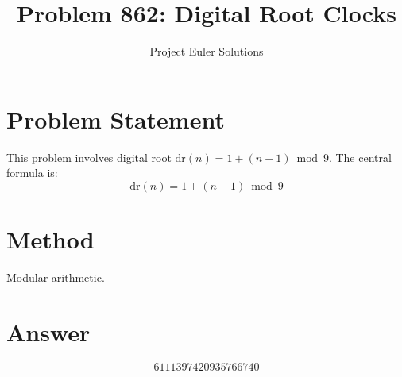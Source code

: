 \documentclass[11pt]{article}
\title{Problem 862: Digital Root Clocks}
\author{Project Euler Solutions}
\date{}
\begin{document}
\maketitle
\section{Problem Statement}
This problem involves digital root $\text{dr}(n) = 1 + (n-1) \bmod 9$. The central formula is:
\[
\text{dr}(n) = 1 + (n-1) \bmod 9
\]
\section{Method}
Modular arithmetic.
\section{Answer}

\[
\boxed{6111397420935766740}
\]
\end{document}
